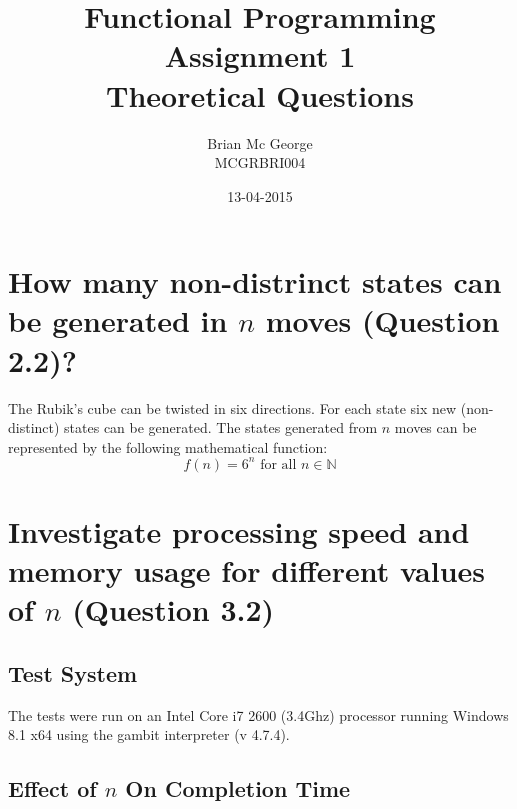 \documentclass[]{article}
\title{Functional Programming Assignment 1\\Theoretical Questions}
\date{13-04-2015}
\author{Brian Mc George\\MCGRBRI004
}
\begin{document}
\maketitle
\newpage

\section{How many non-distrinct states can be generated in \(n\) moves (Question 2.2)?}
The Rubik's cube can be twisted in six directions. For each state six new (non-distinct) states can be generated. The states generated from \(n\) moves can be represented by the following mathematical function:
\begin{equation}\label{func_states}	
	f(n)=6^n\text{ for all }n \in\mathbb{N}
\end{equation}

\section{Investigate processing speed and memory usage for different values of \(n\) (Question 3.2)}
\subsection{Test System}
The tests were run on an Intel Core i7 2600 (3.4Ghz) processor running Windows 8.1 x64 using the gambit interpreter (v 4.7.4).

\subsection{Effect of \(n\) On Completion Time}
\end{document}
